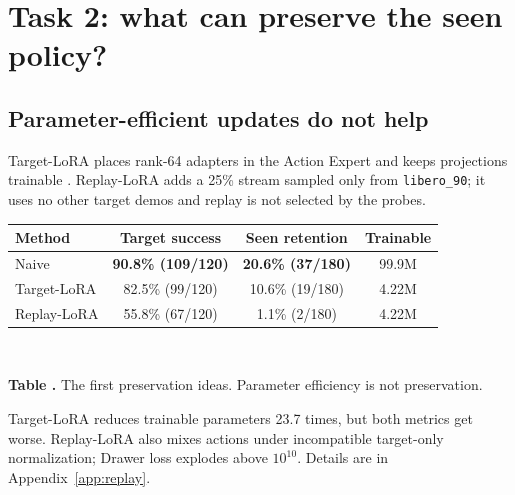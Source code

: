 \documentclass[10pt]{extarticle}
\newcommand{\score}[3]{#1\% (#2/#3)}
\newcommand{\tabcap}[2]{\refstepcounter{table}\label{#2}{\footnotesize\textbf{Table \thetable.} #1\par}}
\begin{document}
\newpage
\section{Task 2: what can preserve the seen policy?}
\subsection{Parameter-efficient updates do not help}
Target-LoRA places rank-64 adapters in the Action Expert and keeps projections
trainable \cite{lora2022}. Replay-LoRA adds a 25\% stream sampled only from
\texttt{libero\_90}; it uses no other target demos and replay is not selected
by the probes.
\begin{center}
\footnotesize
\begin{tabular}{@{}lccc@{}}
\toprule
Method & Target success & Seen retention & Trainable\\
\midrule
Naive & \textbf{\score{90.8}{109}{120}} & \textbf{\score{20.6}{37}{180}} & 99.9M\\
Target-LoRA & \score{82.5}{99}{120} & \score{10.6}{19}{180} & 4.22M\\
Replay-LoRA & \score{55.8}{67}{120} & \score{1.1}{2}{180} & 4.22M\\
\bottomrule
\end{tabular}\\[-1pt]
\tabcap{The first preservation ideas. Parameter efficiency is not preservation.}{tab:lora-main}
\end{center}
Target-LoRA reduces trainable parameters 23.7 times, but both metrics get
worse. Replay-LoRA also mixes actions under incompatible target-only
normalization; Drawer loss explodes above \(10^{10}\). Details are in
Appendix~\ref{app:replay}.
\end{document}
